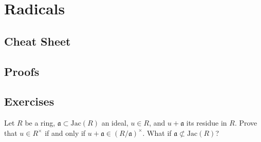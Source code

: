 \chapter{Radicals}

\section{Cheat Sheet}

\section{Proofs}

\section{Exercises}

\begin{exr}
    Let \(R\) be a ring, \(\mathfrak{a} \subset \mathrm{Jac}(R)\) an ideal, \(u \in R\), and \(u + \mathfrak{a}\) its residue in \(R\). Prove that \(u \in R^\times\) if and only if \(u + \mathfrak{a} \in (R / \mathfrak{a})^\times\). What if \(\mathfrak{a} \not\subset \mathrm{Jac}(R)\)?
\end{exr}